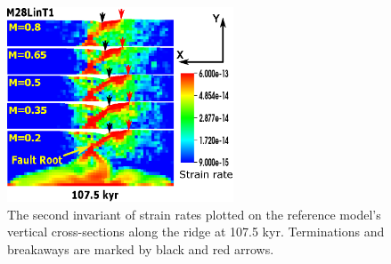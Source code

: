 \begin{figure}[h]
  \centering
    \includegraphics[width=0.6\textwidth]{./Figures/fig_Results1_2.eps}
  \caption[The second invariant of strain rates plotted on the reference model's vertical cross-sections along the ridge at 107.5 kyr.]{The second invariant of strain rates plotted on the reference model's vertical cross-sections along the ridge at 107.5 kyr. Terminations and breakaways are marked by black and red arrows.}
 \label{fig_Results1_2}
\end{figure}   

